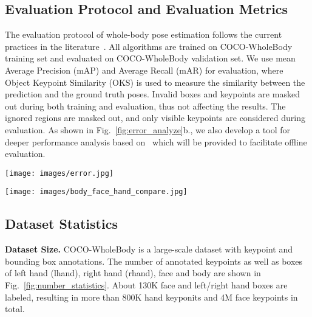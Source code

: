 \documentclass[runningheads]{llncs}
\begin{document}
	
	
	
	\subsection{Evaluation Protocol and Evaluation Metrics}
	The evaluation protocol of whole-body pose estimation follows the current practices in the literature~\cite{lin2014microsoft,wu2017ai}. All algorithms are trained on COCO-WholeBody training set and evaluated on COCO-WholeBody validation set. We use mean Average Precision (mAP) and Average Recall (mAR) for evaluation, where Object Keypoint Similarity (OKS) is used to measure the similarity between the prediction and the ground truth poses. Invalid boxes and keypoints are masked out during both training and evaluation, thus not affecting the results. The ignored regions are masked out, and only visible keypoints are considered during evaluation. As shown in Fig.~\ref{fig:error_analyze}b., we also develop a tool for deeper performance analysis based on~\cite{Ronchi2017Benchmarking} which will be provided to facilitate offline evaluation. 
	
	\begin{figure*}[tb]
		\centering
		\texttt{[image: images/error.jpg]}
		\caption{(a) The normalized standard deviation of manual annotation for each keypoint. Body keypoints have larger manual annotation variance than face and hand keypoints. (b) An example of error diagnosis results of ZoomNet for whole-body pose estimation: jitter, inversion, swap and missing.}
		\label{fig:error_analyze}
	\end{figure*}
	
	\begin{figure*}[tb]
		\centering
		\texttt{[image: images/body\_face\_hand\_compare.jpg]}
		\caption{COCO-WholeBody is challenging as it contains (a) large ``scale variance'' of body/face/hand, measured by the average keypoint distance, (b) more blurry face images than 300W and (c) more complex hand poses than Panoptic.}
		\label{fig:face_hand_compare}
	\end{figure*}
	
	
	\subsection{Dataset Statistics}
	\textbf{Dataset Size.} 
	COCO-WholeBody is a large-scale dataset with keypoint and bounding box annotations. The number of annotated keypoints as well as boxes of left hand (lhand), right hand (rhand), face and body are shown in Fig.~\ref{fig:number_statistics}. About 130K face and left/right hand boxes are labeled, resulting in more than 800K hand keyponits and 4M face keypoints in total.
	
\end{document}
